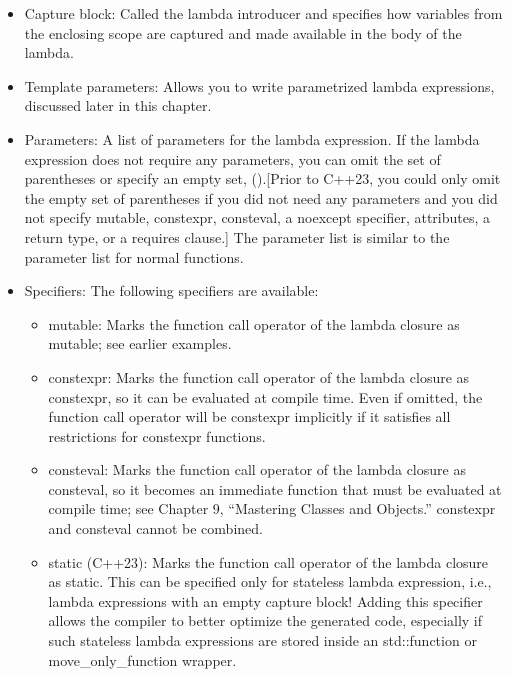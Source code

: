\begin{itemize}
\item
Capture block: Called the lambda introducer and specifies how variables from the enclosing scope are captured and made available in the body of the lambda.

\item
Template parameters: Allows you to write parametrized lambda expressions, discussed later in this chapter.

\item
Parameters: A list of parameters for the lambda expression. If the lambda expression does not require any parameters, you can omit the set of parentheses or specify an empty set, ().[Prior to C++23, you could only omit the empty set of parentheses if you did not need any parameters and you did not specify mutable, constexpr, consteval, a noexcept specifier, attributes, a return type, or a requires clause.] The parameter list is similar to the parameter list for normal functions.

\item
Specifiers: The following specifiers are available:
\begin{itemize}
\item
mutable: Marks the function call operator of the lambda closure as mutable; see earlier examples.

\item
constexpr: Marks the function call operator of the lambda closure as constexpr, so it can be evaluated at compile time. Even if omitted, the function call operator will be constexpr implicitly if it satisfies all restrictions for constexpr functions.

\item
consteval: Marks the function call operator of the lambda closure as consteval, so it becomes an immediate function that must be evaluated at compile time; see Chapter 9, “Mastering Classes and Objects.” constexpr and consteval cannot be combined.


\item
static (C++23): Marks the function call operator of the lambda closure as static. This can be specified only for stateless lambda expression, i.e., lambda expressions with an empty capture block! Adding this specifier allows the compiler to better optimize the generated code, especially if such stateless lambda expressions are stored inside an std::function or move\_only\_function wrapper.
\end{itemize}


\end{itemize}
